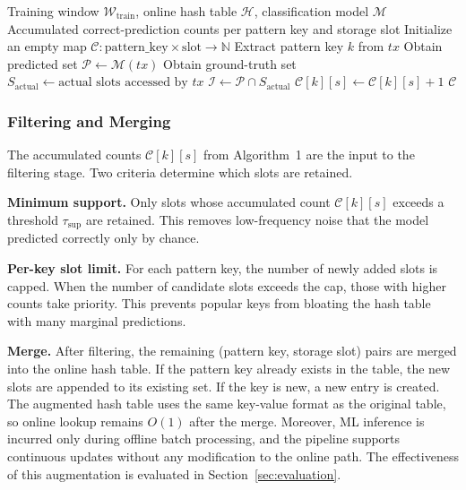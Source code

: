 \documentclass[conference]{IEEEtran}
\begin{document}
\begin{algorithm}[t]
\caption{Candidate Accumulation}
\label{alg:candidate-accum}
\begin{algorithmic}[1]
\Require Training window $\mathcal{W}_{\text{train}}$, online hash table $\mathcal{H}$, classification model $\mathcal{M}$
\Ensure Accumulated correct-prediction counts per pattern key and storage slot
\State Initialize an empty map $\mathcal{C}: \text{pattern\_key} \times \text{slot} \to \mathbb{N}$
    \State Extract pattern key $k$ from $tx$
        \State {}
    \Else
        \State Obtain predicted set $\mathcal{P} \gets \mathcal{M}(tx)$
        \State Obtain ground-truth set $S_{\text{actual}} \gets \text{actual slots accessed by }tx$
        \State $\mathcal{I} \gets \mathcal{P} \cap S_{\text{actual}}$
            \State $\mathcal{C}[k][s] \gets \mathcal{C}[k][s] + 1$
        \EndFor
    \EndIf
\EndFor
\State \Return $\mathcal{C}$
\end{algorithmic}
\end{algorithm}

\subsubsection{Filtering and Merging}
\label{sec:filtering-merging}

The accumulated counts $\mathcal{C}[k][s]$ from Algorithm~1 are the input to the filtering stage. Two criteria determine which slots are retained.

\textbf{Minimum support.}
Only slots whose accumulated count $\mathcal{C}[k][s]$ exceeds a threshold $\tau_{\text{sup}}$ are retained.
This removes low-frequency noise that the model predicted correctly only by chance.

\textbf{Per-key slot limit.}
For each pattern key, the number of newly added slots is capped.
When the number of candidate slots exceeds the cap, those with higher counts take priority.
This prevents popular keys from bloating the hash table with many marginal predictions.

\textbf{Merge.}
After filtering, the remaining (pattern key, storage slot) pairs are merged into the online hash table.
If the pattern key already exists in the table, the new slots are appended to its existing set.
If the key is new, a new entry is created.
The augmented hash table uses the same key-value format as the original table, so online lookup remains $O(1)$ after the merge. Moreover, ML inference is incurred only during offline batch processing, and the pipeline supports continuous updates without any modification to the online path.
The effectiveness of this augmentation is evaluated in Section~\ref{sec:evaluation}.
\end{document}

